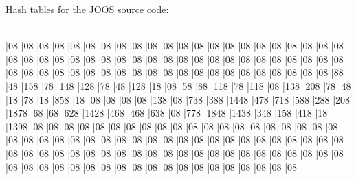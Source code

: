 \begin{slide*}
Hash tables for the JOOS source code:\\
~\\
\begin{barenv}
\setlength{\unitlength}{0.6pt}
\bar{0}{8}
\bar{0}{8}
\bar{0}{8}
\bar{0}{8}
\bar{0}{8}
\bar{0}{8}
\bar{0}{8}
\bar{0}{8}
\bar{0}{8}
\bar{0}{8}
\bar{0}{8}
\bar{0}{8}
\bar{0}{8}
\bar{0}{8}
\bar{0}{8}
\bar{0}{8}
\bar{0}{8}
\bar{0}{8}
\bar{0}{8}
\bar{0}{8}
\bar{0}{8}
\bar{0}{8}
\bar{0}{8}
\bar{0}{8}
\bar{0}{8}
\bar{0}{8}
\bar{0}{8}
\bar{0}{8}
\bar{0}{8}
\bar{0}{8}
\bar{0}{8}
\bar{0}{8}
\bar{0}{8}
\bar{0}{8}
\bar{0}{8}
\bar{0}{8}
\bar{0}{8}
\bar{0}{8}
\bar{0}{8}
\bar{0}{8}
\bar{0}{8}
\bar{0}{8}
\bar{0}{8}
\bar{0}{8}
\bar{0}{8}
\bar{0}{8}
\bar{0}{8}
\bar{0}{8}
\bar{0}{8}
\bar{0}{8}
\bar{0}{8}
\bar{0}{8}
\bar{0}{8}
\bar{0}{8}
\bar{0}{8}
\bar{0}{8}
\bar{0}{8}
\bar{0}{8}
\bar{0}{8}
\bar{0}{8}
\bar{0}{8}
\bar{0}{8}
\bar{0}{8}
\bar{0}{8}
\bar{0}{8}
\bar{8}{8}
\bar{4}{8}
\bar{15}{8}
\bar{7}{8}
\bar{14}{8}
\bar{12}{8}
\bar{7}{8}
\bar{4}{8}
\bar{12}{8}
\bar{1}{8}
\bar{0}{8}
\bar{5}{8}
\bar{8}{8}
\bar{11}{8}
\bar{7}{8}
\bar{11}{8}
\bar{0}{8}
\bar{13}{8}
\bar{20}{8}
\bar{7}{8}
\bar{4}{8}
\bar{1}{8}
\bar{7}{8}
\bar{1}{8}
\bar{85}{8}
\bar{1}{8}
\bar{0}{8}
\bar{0}{8}
\bar{0}{8}
\bar{0}{8}
\bar{13}{8}
\bar{0}{8}
\bar{73}{8}
\bar{38}{8}
\bar{144}{8}
\bar{47}{8}
\bar{71}{8}
\bar{58}{8}
\bar{28}{8}
\bar{20}{8}
\bar{187}{8}
\bar{6}{8}
\bar{6}{8}
\bar{62}{8}
\bar{142}{8}
\bar{46}{8}
\bar{46}{8}
\bar{63}{8}
\bar{0}{8}
\bar{77}{8}
\bar{184}{8}
\bar{143}{8}
\bar{34}{8}
\bar{15}{8}
\bar{41}{8}
\bar{1}{8}
\bar{139}{8}
\bar{0}{8}
\bar{0}{8}
\bar{0}{8}
\bar{0}{8}
\bar{0}{8}
\bar{0}{8}
\bar{0}{8}
\bar{0}{8}
\bar{0}{8}
\bar{0}{8}
\bar{0}{8}
\bar{0}{8}
\bar{0}{8}
\bar{0}{8}
\bar{0}{8}
\bar{0}{8}
\bar{0}{8}
\bar{0}{8}
\bar{0}{8}
\bar{0}{8}
\bar{0}{8}
\bar{0}{8}
\bar{0}{8}
\bar{0}{8}
\bar{0}{8}
\bar{0}{8}
\bar{0}{8}
\bar{0}{8}
\bar{0}{8}
\bar{0}{8}
\bar{0}{8}
\bar{0}{8}
\bar{0}{8}
\bar{0}{8}
\bar{0}{8}
\bar{0}{8}
\bar{0}{8}
\bar{0}{8}
\bar{0}{8}
\bar{0}{8}
\bar{0}{8}
\bar{0}{8}
\bar{0}{8}
\bar{0}{8}
\bar{0}{8}
\bar{0}{8}
\bar{0}{8}
\bar{0}{8}
\bar{0}{8}
\bar{0}{8}
\bar{0}{8}
\bar{0}{8}
\bar{0}{8}
\bar{0}{8}
\bar{0}{8}
\bar{0}{8}
\bar{0}{8}
\bar{0}{8}
\bar{0}{8}
\bar{0}{8}
\bar{0}{8}
\bar{0}{8}
\bar{0}{8}
\bar{0}{8}
\bar{0}{8}
\bar{0}{8}
\bar{0}{8}
\bar{0}{8}
\bar{0}{8}
\bar{0}{8}
\bar{0}{8}
\bar{0}{8}
\bar{0}{8}
\bar{0}{8}
\bar{0}{8}
\bar{0}{8}
\bar{0}{8}
\bar{0}{8}
\bar{0}{8}
\bar{0}{8}
\bar{0}{8}
\bar{0}{8}
\bar{0}{8}

\end{barenv}
\end{slide*}
